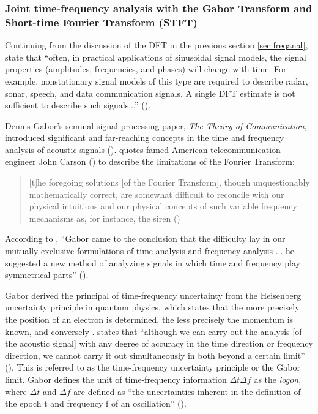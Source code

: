 \documentclass[report.tex]{subfiles}
\begin{document}
\newpagefill

\subsubsection{Joint time-frequency analysis with the Gabor Transform and Short-time Fourier Transform (STFT)}
\label{sec:jointtfa}

Continuing from the discussion of the DFT in the previous section \ref{sec:freqanal},\citeauthor{discretebook} state that ``often, in practical applications of sinusoidal signal models, the signal properties (amplitudes, frequencies, and phases) will change with time. For example, nonstationary signal models of this type are required to describe radar, sonar, speech, and data communication signals. A single DFT estimate is not sufficient to describe such signals...'' (\cite[714]{discretebook}).

Dennis Gabor's seminal signal processing paper, \textit{The Theory of Communication}, introduced significant and far-reaching concepts in the time and frequency analysis of acoustic signals (\cite{gabor1946}). \citeauthor{gabor1946} quotes famed American telecommunication engineer John Carson (\cite{carsonfamous}) to describe the limitations of the Fourier Transform:

\begin{quote}
	[t]he foregoing solutions [of the Fourier Transform], though unquestionably mathematically correct, are somewhat difficult to reconcile with our physical intuitions and our physical concepts of such variable frequency mechanisms as, for instance, the siren (\cite[431]{gabor1946})
\end{quote}

According to \citeauthor{korpel}, ``Gabor came to the conclusion that the difficulty lay in our mutually exclusive formulations of time analysis and frequency analysis ... he suggested a new method of analyzing signals in which time and frequency play symmetrical parts'' (\cite[3,624]{korpel}).

Gabor derived the principal of time-frequency uncertainty from the Heisenberg uncertainty principle in quantum physics, which states that the more precisely the position of an electron is determined, the less precisely the momentum is known, and conversely . \citeauthor{gabor1946} states that ``although we can carry out the analysis [of the acoustic signal] with any degree of accuracy in the time direction or frequency direction, we cannot carry it out simultaneously in both beyond a certain limit'' (\cite[432]{gabor1946}). This is referred to as the time-frequency uncertainty principle or the Gabor limit. Gabor defines the unit of time-frequency information $\Delta t \Delta f$ as the \textit{logon}, where $\Delta t$ and $\Delta f$ are defined as ``the uncertainties inherent in the definition of the epoch t and frequency f of an oscillation'' (\cite[432]{gabor1946}).
\end{document}
